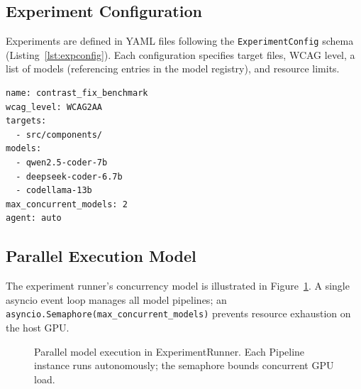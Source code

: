 \documentclass[10pt,conference]{IEEEtran}
\begin{document}
\subsection{Experiment Configuration}

Experiments are defined in YAML files following the
\texttt{ExperimentConfig} schema (Listing~\ref{lst:expconfig}).  Each
configuration specifies target files, WCAG level, a list of models
(referencing entries in the model registry), and resource limits.

\begin{lstlisting}[caption={Example experiment configuration (YAML)},
  label={lst:expconfig},language={},basicstyle=\ttfamily\scriptsize]
name: contrast_fix_benchmark
wcag_level: WCAG2AA
targets:
  - src/components/
models:
  - qwen2.5-coder-7b
  - deepseek-coder-6.7b
  - codellama-13b
max_concurrent_models: 2
agent: auto
\end{lstlisting}

\subsection{Parallel Execution Model}

The experiment runner's concurrency model is illustrated in
Figure~\ref{fig:parallel}.  A single asyncio event loop manages all model
pipelines; an \texttt{asyncio.Semaphore(max\_concurrent\_models)} prevents
resource exhaustion on the host GPU.

\begin{figure}[htbp]
\centering
{}
\caption{Parallel model execution in ExperimentRunner.  Each Pipeline
  instance runs autonomously; the semaphore bounds concurrent GPU load.}
\label{fig:parallel}
\end{figure}
\end{document}
